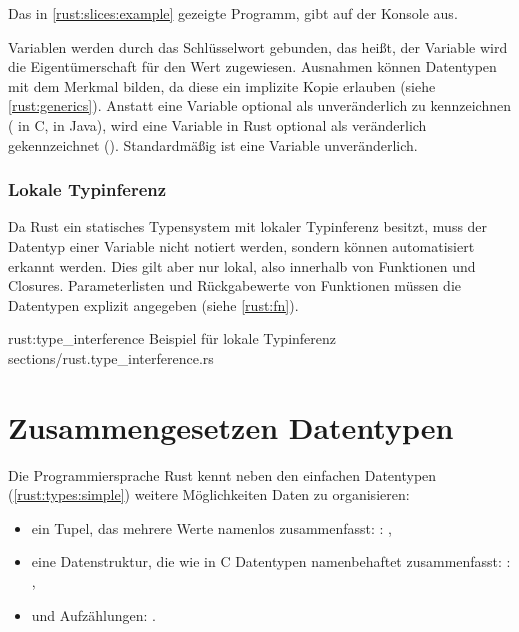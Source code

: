 Das in \autoref{rust:slices:example} gezeigte Programm, gibt auf der Konsole  aus.

Variablen werden durch das  Schlüsselwort gebunden, das heißt, der Variable wird die Eigentümerschaft für den Wert zugewiesen.
Ausnahmen können Datentypen mit dem Merkmal  bilden, da diese ein implizite Kopie erlauben (siehe \autoref{rust:generics}).
Anstatt eine Variable optional als unveränderlich zu kennzeichnen ( in C,  in Java), wird eine Variable in Rust optional als veränderlich gekennzeichnet (). Standardmäßig ist eine Variable unveränderlich.

\subsubsection{Lokale Typinferenz}

Da Rust ein statisches Typensystem mit lokaler Typinferenz besitzt, muss der Datentyp einer Variable nicht notiert werden, sondern können automatisiert erkannt werden.
Dies gilt aber nur lokal, also innerhalb von Funktionen und Closures.
Parameterlisten und Rückgabewerte von Funktionen müssen die Datentypen explizit angegeben (siehe \autoref{rust:fn}).

\rustcinclude
	{rust:type_interference}
	{Beispiel für lokale Typinferenz}
	{sections/rust.type_interference.rs}
	



\section{Zusammengesetzen Datentypen}
\label{rust:types:composed}

Die Programmiersprache Rust kennt neben den einfachen Datentypen (\autoref{rust:types:simple}) weitere Möglichkeiten Daten zu organisieren:
\begin{itemize}
	\item ein Tupel, das mehrere Werte namenlos zusammenfasst: : ,
	\item eine Datenstruktur, die wie in C Datentypen namenbehaftet zusammenfasst: \linebreak{}: ,
	\item und Aufzählungen: .
\end{itemize}

